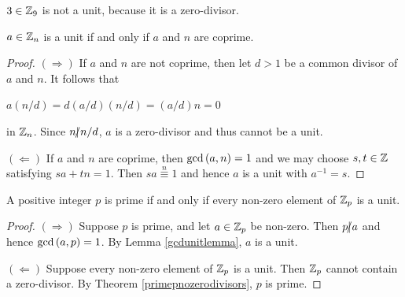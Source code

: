\documentclass[11pt,fleqn,dvipsnames,usenames]{article}
\begin{document}
\begin{example}
$3\in\mathbb{Z}_9$ is not a unit, because it is a zero-divisor.
\end{example}
%
\begin{lemma}\label{gcdunitlemma}
$a\in\mathbb{Z}_{n}$ is a unit if and only if $a$ and $n$ are coprime.
\end{lemma}
%
\begin{proof}\phantom{-}

$(\Rightarrow)$ If $a$ and $n$ are not coprime, then let $d>1$ be a common divisor of $a$ and $n$.  It follows that
\begin{center}
$a(n/d) = d(a/d)(n/d) = (a/d)n = 0$
\end{center}
in $\mathbb{Z}_{n}$.  Since $n|\kern-0.9ex{/} n/d$, $a$ is a zero-divisor and thus cannot be a unit.

$(\Leftarrow)$ If $a$ and $n$ are coprime, then $\text{gcd}\left(a,n\right) = 1$ and we may choose $s,t\in\mathbb{Z}$ satisfying $sa + tn = 1$.  Then $sa\overset{n}{\equiv} 1$ and hence $a$ is a unit with $a^{-1} = s$.
\end{proof}
%
\begin{theorem}\label{Znallunits}
A positive integer $p$ is prime if and only if every non-zero element of $\mathbb{Z}_p$ is a unit.
\end{theorem}
%
\begin{proof}\phantom{-}

$(\Rightarrow)$ Suppose $p$ is prime, and let $a\in\mathbb{Z}_p$ be non-zero.  Then $p|\kern-0.9ex{/} a$ and hence $\text{gcd}\left(a,p\right) = 1$.  By Lemma \ref{gcdunitlemma}, $a$ is a unit.

$(\Leftarrow)$ Suppose every non-zero element of $\mathbb{Z}_p$ is a unit.  Then $\mathbb{Z}_p$ cannot contain a zero-divisor.  By Theorem \ref{primepnozerodivisors}, $p$ is prime.
\end{proof}
\end{document}
